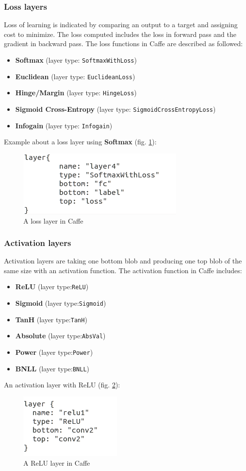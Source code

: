 \subsubsection{Loss layers}
Loss of learning is indicated by comparing an output to a target and assigning cost to minimize. The loss computed includes the loss in forward pass and the gradient in backward pass. The loss functions in Caffe are described as followed:
\begin{itemize}
	\item \textbf{Softmax} (layer type: \texttt{SoftmaxWithLoss})
	\item \textbf{Euclidean} (layer type: \texttt{EuclideanLoss})
	\item \textbf{Hinge/Margin} (layer type: \texttt{HingeLoss})
	\item \textbf{Sigmoid Cross-Entropy} (layer type: \texttt{SigmoidCrossEntropyLoss})
	\item \textbf{Infogain} (layer type: \texttt{Infogain})
\end{itemize}
Example about a loss layer using \textbf{Softmax} (fig. \ref{figstloss}):
\begin{figure}[!h]
	\centering
	\includegraphics[scale=0.7]{images/stloss}
	\caption{A loss layer in Caffe}
	\label{figstloss}
\end{figure}
\subsubsection{Activation layers}
Activation layers are taking one bottom blob and producing one top blob of the same size with an activation function. The activation function in Caffe includes:
\begin{itemize}
	\item \textbf{ReLU} (layer type:\texttt{ReLU})
	\item \textbf{Sigmoid} (layer type:\texttt{Sigmoid})
	\item \textbf{TanH} (layer type:\texttt{TanH})
	\item \textbf{Absolute} (layer type:\texttt{AbsVal})
	\item \textbf{Power} (layer type:\texttt{Power})
	\item \textbf{BNLL} (layer type:\texttt{BNLL})
\end{itemize}
An activation layer with ReLU (fig. \ref{figstrelu}):
\begin{figure}[!h]
	\centering
	\includegraphics[scale=0.7]{images/strelu}
	\caption{A ReLU layer in Caffe}
	\label{figstrelu}
\end{figure}
